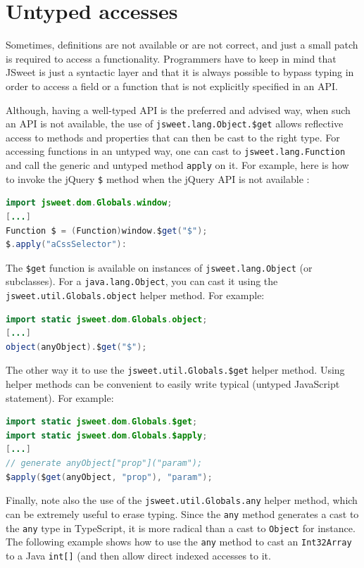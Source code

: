 \documentclass[a4paper]{report}
\begin{document}
\section{Untyped accesses}

Sometimes, definitions are not available or are not correct, and just a small patch is required to access a functionality. Programmers have to keep in mind that JSweet is just a syntactic layer and that it is always possible to bypass typing in order to access a field or a function that is not explicitly specified in an API.

Although, having a well-typed API is the preferred and advised way, when such an API is not available, the use of \texttt{jsweet.\-lang.\-Object.\$get} allows reflective access to methods and properties that can then be cast to the right type. For accessing functions in an untyped way, one can cast to \texttt{jsweet.\-lang.\-Function} and call the generic and untyped method \texttt{apply} on it.  For example, here is how to invoke the jQuery \texttt{\$} method when the jQuery API is not available :

\begin{lstlisting}[language=Java]
import jsweet.dom.Globals.window;
[...]
Function $ = (Function)window.$get("$");
$.apply("aCssSelector"):
\end{lstlisting}

The \texttt{\$get} function is available on instances of \texttt{jsweet.lang.Object} (or subclasses). For a \texttt{java.lang.Object}, you can cast it using the \texttt{jsweet.util.Globals.object} helper method. For example:

\begin{lstlisting}[language=Java]
import static jsweet.dom.Globals.object;
[...]
object(anyObject).$get("$");
\end{lstlisting}

The other way it to use the \texttt{jsweet.util.Globals.\$get} helper method. Using helper methods can be convenient to easily write typical (untyped JavaScript statement). For example:

\begin{lstlisting}[language=Java]
import static jsweet.dom.Globals.$get;
import static jsweet.dom.Globals.$apply;
[...]
// generate anyObject["prop"]("param"); 
$apply($get(anyObject, "prop"), "param"); 
\end{lstlisting}

Finally, note also the use of the \texttt{jsweet.util.Globals.any} helper method, which can be extremely useful to erase typing. Since the \texttt{any} method generates a cast to the \texttt{any} type in TypeScript, it is more radical than a cast to \texttt{Object} for instance. The following example shows how to use the \texttt{any} method to cast an \texttt{Int32Array} to a Java \texttt{int[]} (and then allow direct indexed accesses to it.
\end{document}
